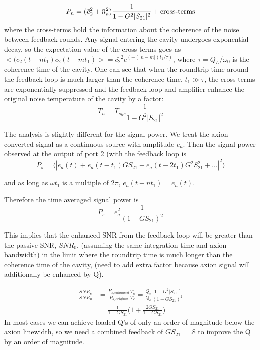 \documentclass[aps,prl,twocolumn,groupedaddress]{revtex4-1}
\begin{document}
\begin{equation}
P_n = (\bar{c}_2^2 + \bar{n}_a^2)\frac{1}{1 - G^2|S_{21}|^2} + \text{cross-terms} \\
\end{equation}
where the cross-terms hold the information about the coherence of the noise between feedback rounds. Any signal entering the cavity undergoes exponential decay, so the expectation value of the cross terms goes as $<(c_2(t-nt_1)c_2(t-mt_1)> = \bar{c_2}^2e^(-(|n-m|)t_1/\tau)$, where $\tau = Q_L/\omega_0$ is the coherence time of the cavity. One can see that when the roundtrip time around the feedback loop is much larger than the coherence time, $t_1 \gg \tau$, the cross terms are exponentially suppressed and the feedback loop and amplifier enhance the original noise temperature of the cavity by a factor:
\begin{equation}
T_n = T_{sys}\frac{1}{1-G^2|S_{21}|^2}
\end{equation}

The analysis is slightly different for the signal power. We treat the axion-converted signal as a continuous source with amplitude $e_a$. Then the signal power observed at the output of port 2 (with the feedback loop is
\begin{equation}
P_s = \langle |e_a(t) + e_a(t-t_1)GS_{21} + e_a(t-2t_1)G^2S_{21}^2 + \ldots|^2 \rangle
\end{equation}

and as long as $\omega t_1$ is a multiple of $2\pi$, $e_a(t-nt_1) = e_a(t)$.

Therefore the time averaged signal power is
\begin{equation}
P_s = \bar{e}_a^2\frac{1}{(1 - GS_{21})^2}
\end{equation}

This implies that the enhanced SNR from the feedback loop will be greater than the passive SNR, $SNR_0$, (assuming the same integration time and axion bandwidth) in the limit where the roundtrip time is much longer than the coherence time of the cavity, (need to add extra factor because axion signal will additionally be enhanced by Q).

\begin{align}
\frac{SNR_{e}}{SNR_{0}} &=\frac{P_{s, enhanced}}{P_{s,original}}\frac{T_o}{T_e} = \frac{Q_e}{Q_o}\frac{1-G^2|S_{21}|^2}{(1-GS_{21})^2} 
\\ &= \frac{1}{1-GS_{21}}\bigg(1 + \frac{2GS_{21}}{1-GS_{21}}\bigg)
\end{align}
In most cases we can achieve loaded Q's of only an order of magnitude below the axion linewidth, so we need a combined feedback of $GS_{21} = .8$ to improve the Q by an order of magnitude.
\end{document}
